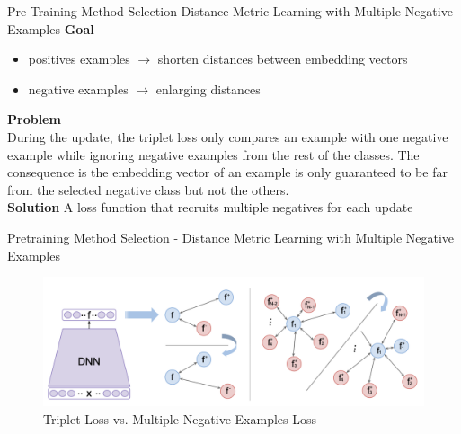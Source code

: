 \documentclass[aspectratio=169,xcolor=dvipsnames]{beamer}
\begin{document}
\begin{frame}{Pre-Training Method Selection-Distance Metric Learning with Multiple Negative Examples}
    \textbf{Goal} 
    \begin{itemize}
        \item positives examples $\rightarrow$ shorten distances between embedding vectors 
        \item negative examples $\rightarrow$ enlarging distances
    \end{itemize}
    \bigskip
    \textbf{Problem}\\
    During the update, the triplet loss only compares an example with one negative example while ignoring negative examples from the rest of the classes. The consequence is the embedding vector of an example is only guaranteed to be far from the selected negative class but not the others. \\
    \bigskip
    \textbf{Solution} A loss function that recruits multiple negatives for each update
    
\end{frame}


\begin{frame}{Pretraining Method Selection - Distance Metric Learning with Multiple Negative Examples}
    \begin{figure}
        \centering
        \includegraphics[width=0.9\linewidth]{figures/one_negative_vs_multiple_negative.png}
        \caption{Triplet Loss vs. Multiple Negative Examples Loss }
        \label{onmn}
    \end{figure}
\end{frame}

\end{document}
